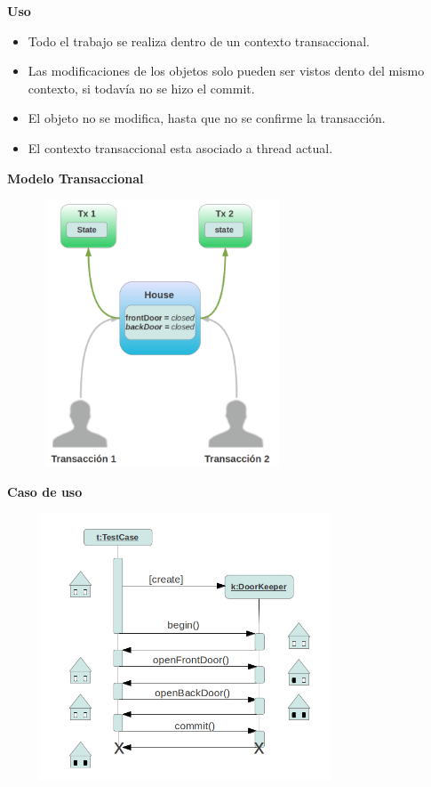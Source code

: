 	{\bf Uso}
	\begin{itemize}
	  \item Todo el trabajo se realiza dentro de un contexto transaccional.
	  
	  \item Las modificaciones de los objetos solo pueden ser vistos dento del
	  mismo contexto, si todavía no se hizo el commit.
	   
	  \item El objeto no se modifica, hasta que no se confirme la transacción.
	  
	   \item El contexto transaccional esta asociado a thread actual.
	\end{itemize}


	{\bf Modelo Transaccional}
	
	\includegraphics[width=350px, height=300px]{img/transacionalModel}
	
	{\bf Caso de uso}
	
	\includegraphics[width=400px, height=300px]{img/tescasePOT}
	
